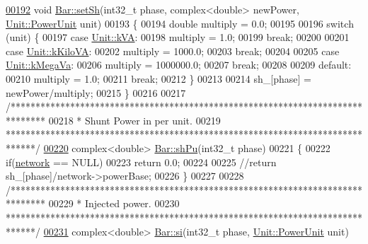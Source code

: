 \begin{DoxyCode}
\hypertarget{bar_8cpp_source_l00192}{}\hyperlink{group___models_ga207abd3d0649a488e3c44cf2a501ed23}{00192} \textcolor{keywordtype}{void} \hyperlink{group___models_ga207abd3d0649a488e3c44cf2a501ed23}{Bar::setSh}(int32\_t phase, complex<double> newPower, 
      \hyperlink{class_unit_ace265ae255370ccacfd5370337572c3b}{Unit::PowerUnit} unit)
00193 \{
00194   \textcolor{keywordtype}{double} multiply = 0.0;
00195 
00196   \textcolor{keywordflow}{switch} (unit) \{
00197   \textcolor{keywordflow}{case} \hyperlink{class_unit_ace265ae255370ccacfd5370337572c3ba72b181a842ae2759488a2fa1410d3696}{Unit::kVA}:
00198     multiply = 1.0;
00199     \textcolor{keywordflow}{break};
00200 
00201   \textcolor{keywordflow}{case} \hyperlink{class_unit_ace265ae255370ccacfd5370337572c3bac9e5154522fbb810d7aed75c3ff47cb2}{Unit::kKiloVA}:
00202     multiply = 1000.0;
00203     \textcolor{keywordflow}{break};
00204 
00205   \textcolor{keywordflow}{case} \hyperlink{class_unit_ace265ae255370ccacfd5370337572c3ba6039da0ed20f8bee64305bab8bdec365}{Unit::kMegaVa}:
00206     multiply = 1000000.0;
00207     \textcolor{keywordflow}{break};
00208 
00209   \textcolor{keywordflow}{default}:
00210     multiply = 1.0;
00211     \textcolor{keywordflow}{break};
00212   \}
00213 
00214   sh\_[phase] = newPower/multiply;
00215 \}
00216 
00217 \textcolor{comment}{/*******************************************************************************}
00218 \textcolor{comment}{ * Shunt Power in per unit.}
00219 \textcolor{comment}{ ******************************************************************************/}
\hypertarget{bar_8cpp_source_l00220}{}\hyperlink{group___models_ga7df2ed5705f06c0cf2937d25102ca847}{00220} complex<double> \hyperlink{group___models_ga7df2ed5705f06c0cf2937d25102ca847}{Bar::shPu}(int32\_t phase)
00221 \{
00222   \textcolor{keywordflow}{if}(\hyperlink{class_bar_a80025f13884750add58cc61b318357ff}{network} == NULL)
00223     \textcolor{keywordflow}{return} 0.0;
00224 
00225   \textcolor{comment}{//return sh\_[phase]/network->powerBase;}
00226 \}
00227 
00228 \textcolor{comment}{/*******************************************************************************}
00229 \textcolor{comment}{ * Injected power.}
00230 \textcolor{comment}{ ******************************************************************************/}
\hypertarget{bar_8cpp_source_l00231}{}\hyperlink{group___models_ga02bbc279f1e133f66b12ee21e7bebcd8}{00231} complex<double> \hyperlink{group___models_ga02bbc279f1e133f66b12ee21e7bebcd8}{Bar::si}(int32\_t phase, \hyperlink{class_unit_ace265ae255370ccacfd5370337572c3b}{Unit::PowerUnit} unit)

\end{DoxyCode}
